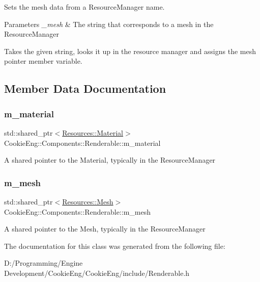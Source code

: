 Sets the mesh data from a Resource\+Manager name. 


\begin{DoxyParams}{Parameters}
{\em \+\_\+mesh} & The string that corresponds to a mesh in the Resource\+Manager\\
\hline
\end{DoxyParams}
Takes the given string, looks it up in the resource manager and assigns the mesh pointer member variable. 

\subsection{Member Data Documentation}
\mbox{\label{class_cookie_eng_1_1_components_1_1_renderable_a69e36f6c8b8d58c978d86f2591c53ec5}} 
\subsubsection{\texorpdfstring{m\+\_\+material}{m\_material}}
{\footnotesize\ttfamily std\+::shared\+\_\+ptr$<$\hyperlink{class_cookie_eng_1_1_resources_1_1_material}{Resources\+::\+Material}$>$ Cookie\+Eng\+::\+Components\+::\+Renderable\+::m\+\_\+material\hspace{0.3cm}{\ttfamily [protected]}}

A shared pointer to the Material, typically in the Resource\+Manager \mbox{\label{class_cookie_eng_1_1_components_1_1_renderable_a9da5e010c1d6c0ccb008b2af664b925a}} 
\subsubsection{\texorpdfstring{m\+\_\+mesh}{m\_mesh}}
{\footnotesize\ttfamily std\+::shared\+\_\+ptr$<$\hyperlink{struct_cookie_eng_1_1_resources_1_1_mesh}{Resources\+::\+Mesh}$>$ Cookie\+Eng\+::\+Components\+::\+Renderable\+::m\+\_\+mesh\hspace{0.3cm}{\ttfamily [protected]}}

A shared pointer to the Mesh, typically in the Resource\+Manager 

The documentation for this class was generated from the following file\+:\begin{DoxyCompactItemize}
\item 
D\+:/\+Programming/\+Engine Development/\+Cookie\+Eng/\+Cookie\+Eng/include/Renderable.\+h\end{DoxyCompactItemize}
